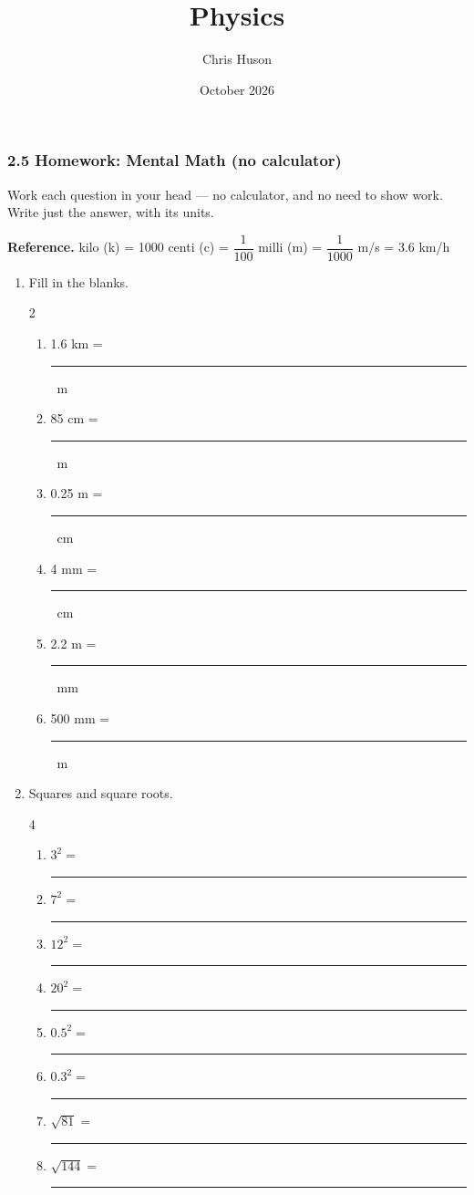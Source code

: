 \documentclass[12pt, twoside]{article}
\title{Physics}
\author{Chris Huson}
\date{October 2026}
\newcommand{\blank}[1][2.4cm]{\rule{#1}{0.4pt}}
\begin{document}
\subsubsection*{2.5 Homework: Mental Math (no calculator)}

Work each question in your head --- no calculator, and no need to show work. Write
just the answer, with its units.

\vspace{0.15cm}

\textbf{Reference.} \quad
kilo (k) = 1000 \quad centi (c) = $\dfrac{1}{100}$ \quad
milli (m) = $\dfrac{1}{1000}$  m/s = 3.6 km/h

\vspace{0.2cm}

\begin{enumerate}[itemsep=0.4cm]

\item Fill in the blanks.
  \begin{multicols}{2}
    \begin{enumerate}[itemsep=0.5cm]
      \item 1.6 km = \blank\ m
      \item 85 cm = \blank\ m
      \item 0.25 m = \blank\ cm
      \item 4 mm = \blank\ cm
      \item 2.2 m = \blank\ mm
      \item 500 mm = \blank\ m
    \end{enumerate}
  \end{multicols}

\item Squares and square roots.
  \begin{multicols}{4}
    \begin{enumerate}[itemsep=0.6cm]
      \item $3^2 = $ \blank[1.1cm]
      \item $7^2 = $ \blank[1.1cm]
      \item $12^2 = $ \blank[1.1cm]
      \item $20^2 = $ \blank[1.1cm]
      \item $0.5^2 = $ \blank[1.1cm]
      \item $0.3^2 = $ \blank[1.1cm]
      \item $\sqrt{81} = $ \blank[1.1cm]
      \item $\sqrt{144} = $ \blank[1.1cm]
    \end{enumerate}
  \end{multicols}


\end{enumerate}
\end{document}
